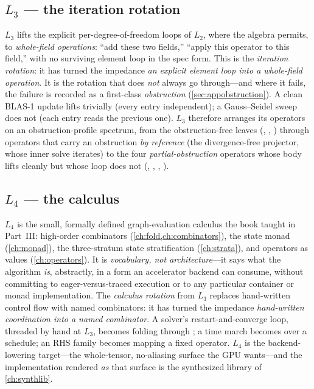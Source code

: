 \subsection*{$L_3$ --- the iteration rotation}

$L_3$ lifts the explicit per-degree-of-freedom loops of $L_2$, where the algebra
permits, to \emph{whole-field operations}: ``add these two fields,'' ``apply this
operator to this field,'' with no surviving element loop in the spec form. This is the
\emph{iteration rotation}: it has turned the impedance \emph{an explicit element loop
into a whole-field operation}. It is the rotation that does \emph{not} always go
through---and where it fails, the failure is recorded as a first-class
\emph{obstruction} (\cref{sec:appobstruction}). A clean BLAS-1 update lifts trivially
(every entry independent); a Gauss--Seidel sweep does not (each entry reads the
previous one). $L_3$ therefore arranges its operators on an obstruction-profile
spectrum, from the obstruction-free leaves (, ,
) through operators that carry an obstruction \emph{by reference}
(the divergence-free projector, whose inner solve iterates) to the four
\emph{partial-obstruction} operators whose body lifts cleanly but whose loop does not
(, , , ).

\subsection*{$L_4$ --- the calculus}

$L_4$ is the small, formally defined graph-evaluation calculus the book taught in
Part~III: high-order combinators (\cref{ch:fold,ch:combinators}), the state monad
(\cref{ch:monad}), the three-stratum state stratification (\cref{ch:strata}), and
operators as values (\cref{ch:operators}). It is \emph{vocabulary, not architecture}---it
says what the algorithm \emph{is}, abstractly, in a form an accelerator backend can
consume, without committing to eager-versus-traced execution or to any particular
container or monad implementation. The \emph{calculus rotation} from $L_3$ replaces
hand-written control flow with named combinators: it has turned the impedance
\emph{hand-written coordination into a named combinator}. A solver's restart-and-converge
loop, threaded by hand at $L_3$, becomes  folding 
through ; a time march becomes  over a schedule;
an RHS family becomes  mapping a fixed operator. $L_4$ is the
backend-lowering target---the whole-tensor, no-aliasing surface the GPU wants---and the
implementation rendered \emph{as} that surface is the synthesized library of
\cref{ch:synthlib}.

